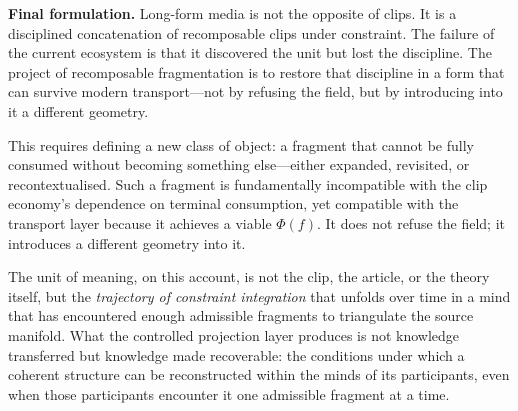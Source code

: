 \documentclass{amsart}
\theoremstyle{plain}
\theoremstyle{definition}
\theoremstyle{remark}
\newcommand{\scalar}{\Phi}
\begin{document}
\begin{claimbox}
  \textbf{Final formulation.}  Long-form media is not the opposite of clips.  It
  is a disciplined concatenation of recomposable clips under constraint.  The
  failure of the current ecosystem is that it discovered the unit but lost the
  discipline.  The project of recomposable fragmentation is to restore that
  discipline in a form that can survive modern transport---not by refusing the
  field, but by introducing into it a different geometry.
\end{claimbox}

This requires defining a new class of object: a fragment that cannot be fully
consumed without becoming something else---either expanded, revisited, or
recontextualised.  Such a fragment is fundamentally incompatible with the clip
economy's dependence on terminal consumption, yet compatible with the transport
layer because it achieves a viable $\scalar(f)$.  It does not refuse the field; it
introduces a different geometry into it.

The unit of meaning, on this account, is not the clip, the article, or the theory
itself, but the \emph{trajectory of constraint integration} that unfolds over time
in a mind that has encountered enough admissible fragments to triangulate the source
manifold.  What the controlled projection layer produces is not knowledge
transferred but knowledge made recoverable: the conditions under which a coherent
structure can be reconstructed within the minds of its participants, even when
those participants encounter it one admissible fragment at a time.
\end{document}
